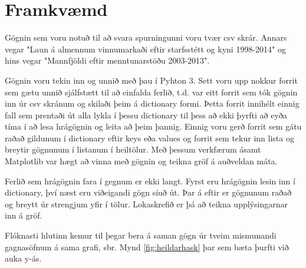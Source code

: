 \documentclass[12pt, git, draft]{rureport}
\begin{document}


\section{Framkvæmd}

Gögnin sem voru notuð til að svara spurningunni voru tvær csv skrár. Annars vegar "Laun á almennum vinnumarkaði eftir starfsstétt og kyni 1998-2014"\cite{HG1} og hins vegar "Mannfjöldi eftir menntunarstöðu 2003-2013"\cite{HG2}.

Gögnin voru tekin inn og unnið með þau í Pyhton 3\cite{python3}. Sett voru upp nokkur forrit sem gætu unnið sjálfstætt til að einfalda ferlið, t.d. var eitt forrit sem tók gögnin inn úr csv skránum og skilaði þeim á dictionary formi. Þetta forrit innihélt einnig fall sem prentaði út alla lykla í þessu dictionary til þess að ekki þyrfti að eyða tíma í að lesa hrágögnin og leita að þeim þannig.
Einnig voru gerð forrit sem gátu raðað gildunum í dictionary eftir keys eða values og forrit sem tekur inn lista og breytir gögnunum í listanum í heiltölur. Með þessum verkfærum ásamt Matplotlib\cite{lib} var hægt að vinna með gögnin og teikna gröf á auðveldan máta. 



Ferlið sem hrágögnin fara í gegnum er ekki langt. Fyrst eru hrágögnin lesin inn í dictionary, því næst eru viðeigandi gögn síuð út. Þar á eftir er gögnunum raðað og breytt úr strengjum yfir í tölur. Lokaskrefið er þá að teikna upplýsingarnar inn á gröf.

Flóknasti hlutinn kemur til þegar bera á saman gögn úr tveim mismunandi gagnasöfnum á sama grafi, sbr. Mynd \ref{fig:heildarhask} þar sem bæta þurfti við auka y-ás.
\end{document}
